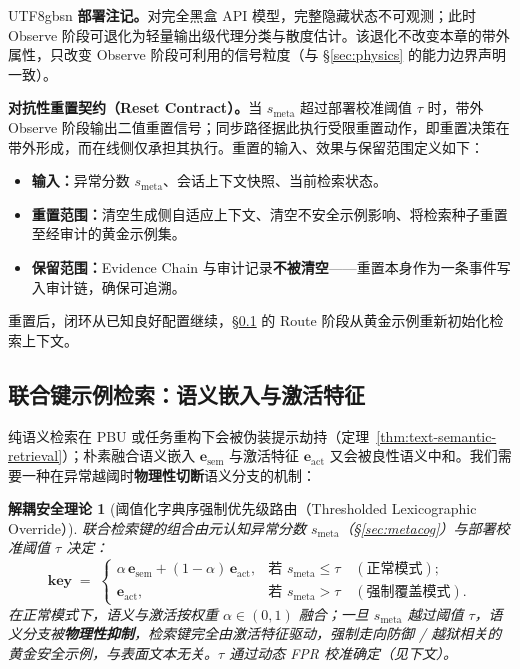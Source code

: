 \documentclass[letterpaper,twocolumn,10pt]{article}
\newtheorem{definition}[theorem]{解耦安全理论}
\begin{document}
\begin{CJK}{UTF8}{gbsn}
\textbf{部署注记。}对完全黑盒 API 模型，完整隐藏状态不可观测；此时 Observe 阶段可退化为轻量输出级代理分类与散度估计。该退化不改变本章的带外属性，只改变 Observe 阶段可利用的信号粒度（与 \S\ref{sec:physics} 的能力边界声明一致）。

\textbf{对抗性重置契约（Reset Contract）。}当 $s_{\mathrm{meta}}$ 超过部署校准阈值 $\tau$ 时，带外 Observe 阶段输出二值重置信号；同步路径据此执行受限重置动作，即重置决策在带外形成，而在线侧仅承担其执行。重置的输入、效果与保留范围定义如下：

\begin{itemize}[nosep,leftmargin=*]
\item \textbf{输入：}异常分数 $s_{\mathrm{meta}}$、会话上下文快照、当前检索状态。
\item \textbf{重置范围：}清空生成侧自适应上下文、清空不安全示例影响、将检索种子重置至经审计的黄金示例集。
\item \textbf{保留范围：}Evidence Chain 与审计记录\textbf{不被清空}——重置本身作为一条事件写入审计链，确保可追溯。
\end{itemize}

\noindent 重置后，闭环从已知良好配置继续，\S\ref{sec:joint-key} 的 Route 阶段从黄金示例重新初始化检索上下文。

\subsection{联合键示例检索：语义嵌入与激活特征}
\label{sec:joint-key}

纯语义检索在 PBU 或任务重构下会被伪装提示劫持（定理~\ref{thm:text-semantic-retrieval}）；朴素融合语义嵌入 $\mathbf{e}_{\mathrm{sem}}$ 与激活特征 $\mathbf{e}_{\mathrm{act}}$ 又会被良性语义中和。我们需要一种在异常越阈时\textbf{物理性切断}语义分支的机制：

\begin{definition}[阈值化字典序强制优先级路由（Thresholded Lexicographic Override）]
\label{mech:override}
联合检索键的组合由元认知异常分数 $s_{\mathrm{meta}}$（\S\ref{sec:metacog}）与部署校准阈值 $\tau$ 决定：
\[
\mathbf{key} \;=\;
\begin{cases}
\alpha\,\mathbf{e}_{\mathrm{sem}} + (1-\alpha)\,\mathbf{e}_{\mathrm{act}}, & \text{若 } s_{\mathrm{meta}} \le \tau \quad (\text{正常模式}); \\[4pt]
\mathbf{e}_{\mathrm{act}}, & \text{若 } s_{\mathrm{meta}} > \tau \quad (\text{强制覆盖模式}).
\end{cases}
\]
在正常模式下，语义与激活按权重 $\alpha \in (0,1)$ 融合；一旦 $s_{\mathrm{meta}}$ 越过阈值 $\tau$，语义分支被\textbf{物理性抑制}，检索键完全由激活特征驱动，强制走向防御 / 越狱相关的黄金安全示例，与表面文本无关。$\tau$ 通过动态 FPR 校准确定（见下文）。
\end{definition}


\end{CJK}
\end{document}
